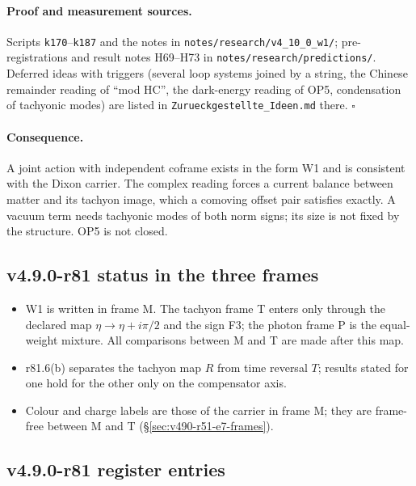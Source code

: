 \paragraph{Proof and measurement sources.}
Scripts \texttt{k170}--\texttt{k187} and the notes in \texttt{notes/\allowbreak research/\allowbreak v4\_10\_0\_w1/}; pre-registrations and
result notes H69--H73 in \texttt{notes/\allowbreak research/\allowbreak predictions/}.  Deferred ideas with triggers (several loop systems
joined by a string, the Chinese remainder reading of ``mod HC'', the dark-energy reading of OP5, condensation of tachyonic modes) are
listed in \texttt{Zurueckgestellte\_\allowbreak Ideen.md} there.  \(\square\)

\paragraph{Consequence.}
A joint action with independent coframe exists in the form W1 and is consistent with the Dixon carrier.  The complex reading forces a
current balance between matter and its tachyon image, which a comoving offset pair satisfies exactly.  A vacuum term needs tachyonic
modes of both norm signs; its size is not fixed by the structure.  OP5 is not closed.

\subsection*{v4.9.0-r81 status in the three frames}
\label{subsec:v490-r81-frames}

\begin{itemize}[leftmargin=2em]
\item W1 is written in frame M.  The tachyon frame T enters only through the declared map \(\eta\to\eta+i\pi/2\) and the sign F3; the
photon frame P is the equal-weight mixture.  All comparisons between M and T are made after this map.
\item r81.6(b) separates the tachyon map \(R\) from time reversal \(T\); results stated for one hold for the other only on the compensator axis.
\item Colour and charge labels are those of the carrier in frame M; they are frame-free between M and T (\S\ref{sec:v490-r51-e7-frames}).
\end{itemize}

\subsection*{v4.9.0-r81 register entries}
\label{subsec:v490-r81-register}

